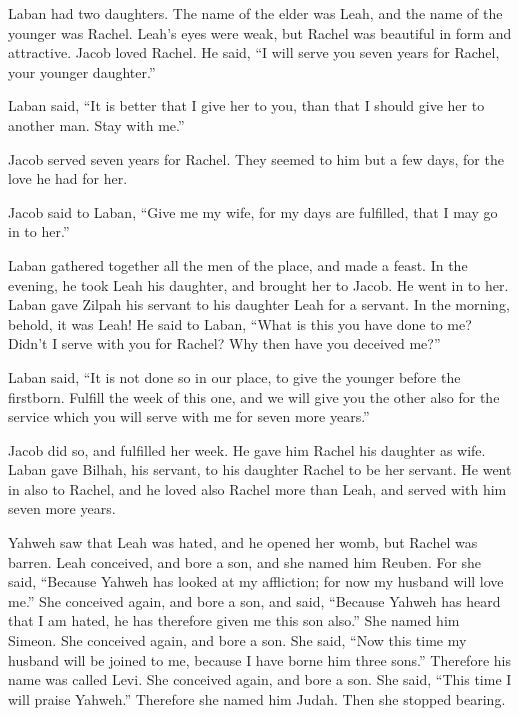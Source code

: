  Laban had two daughters. The name of the elder was Leah,
and the name of the younger was Rachel.  Leah's eyes were
weak, but Rachel was beautiful in form and attractive. 
Jacob loved Rachel. He said, ``I will serve you seven years for Rachel,
your younger daughter.''

 Laban said, ``It is better that I give her to you, than
that I should give her to another man. Stay with me.''

 Jacob served seven years for Rachel. They seemed to him
but a few days, for the love he had for her.

 Jacob said to Laban, ``Give me my wife, for my days are
fulfilled, that I may go in to her.''

 Laban gathered together all the men of the place, and
made a feast.  In the evening, he took Leah his daughter,
and brought her to Jacob. He went in to her.  Laban gave
Zilpah his servant to his daughter Leah for a servant. 
In the morning, behold, it was Leah! He said to Laban, ``What is this
you have done to me? Didn't I serve with you for Rachel? Why then have
you deceived me?''

 Laban said, ``It is not done so in our place, to give
the younger before the firstborn.  Fulfill the week of
this one, and we will give you the other also for the service which you
will serve with me for seven more years.''

 Jacob did so, and fulfilled her week. He gave him Rachel
his daughter as wife.  Laban gave Bilhah, his servant, to
his daughter Rachel to be her servant.  He went in also
to Rachel, and he loved also Rachel more than Leah, and served with him
seven more years.

 Yahweh saw that Leah was hated, and he opened her womb,
but Rachel was barren.  Leah conceived, and bore a son,
and she named him Reuben. For she said, ``Because Yahweh has looked at
my affliction; for now my husband will love me.''  She
conceived again, and bore a son, and said, ``Because Yahweh has heard
that I am hated, he has therefore given me this son also.'' She named
him Simeon.  She conceived again, and bore a son. She
said, ``Now this time my husband will be joined to me, because I have
borne him three sons.'' Therefore his name was called Levi.
 She conceived again, and bore a son. She said, ``This
time I will praise Yahweh.'' Therefore she named him Judah. Then she
stopped bearing.


